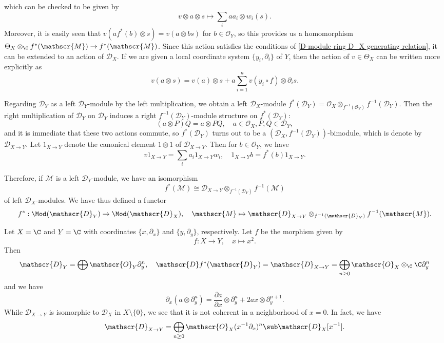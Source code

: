 which can be checked to be given by 
\[v\otimes a\otimes s\mapsto \sum_iaa_i\otimes w_i(s).\]
Moreover, it is easily seen that $v(af^*(b)\otimes s)=v(a\otimes bs)$ for $b\in\mathscr{O}_Y$, so this provides us a homomorphism $\Theta_X\otimes_{\C}f^*(\mathscr{M})\to f^*(\mathscr{M})$. Since this action satisfies the conditions of \cref{D-module ring D_X generating relation}, it can be extended to an action of $\mathscr{D}_X$. If we are given a local coordinate system $\{y_i,\partial_i\}$ of $Y$, then the action of $v\in\Theta_X$ can be written more explicitly as
\begin{equation}\label{D-module inverse image def-4}
v(a\otimes s)=v(a)\otimes s+a\sum_{i=1}^{n}v(y_i\circ f)\otimes\partial_is.
\end{equation}

Regarding $\mathscr{D}_Y$ as a left $\mathscr{D}_Y$-module by the left multiplication, we obtain a left $\mathscr{D}_X$-module $f^*(\mathscr{D}_Y)=\mathscr{O}_X\otimes_{f^{-1}(\mathscr{O}_Y)}f^{-1}(\mathscr{D}_Y)$. Then the right multiplication of $\mathscr{D}_Y$ on $\mathscr{D}_Y$ induces a right $f^{-1}(\mathscr{D}_Y)$-module structure on $f^*(\mathscr{D}_Y)$:
\[(a\otimes P)Q=a\otimes PQ,\quad a\in\mathscr{O}_X,P,Q\in\mathscr{D}_Y,\]
and it is immediate that these two actions commute, so $f^*(\mathscr{D}_Y)$ turns out to be a $(\mathscr{D}_X,f^{-1}(\mathscr{D}_Y))$-bimodule, which is denote by $\mathscr{D}_{X\to Y}$. Let $1_{X\to Y}$ denote the canonical element $1\otimes 1$ of $\mathscr{D}_{X\to Y}$. Then for $b\in\mathscr{O}_Y$, we have
\begin{equation}\label{D-module inverse image def-5}
v1_{X\to Y}=\sum_ia_i1_{X\to Y}w_i,\quad 1_{X\to Y}b=f^*(b)1_{X\to Y}.
\end{equation}

Therefore, if $\mathscr{M}$ is a left $\mathscr{D}_Y$-module, we have an isomorphism
\[f^*(\mathscr{M})\cong \mathscr{D}_{X\to Y}\otimes_{f^{-1}(\mathscr{D}_Y)}f^{-1}(\mathscr{M})\]
of left $\mathscr{D}_X$-modules. We have thus defined a functor
\[f^*:\Mod(\mathscr{D}_Y)\to\Mod(\mathscr{D}_X),\quad \mathscr{M}\mapsto \mathscr{D}_{X\to Y}\otimes_{f^{-1}(\mathscr{D}_Y)}f^{-1}(\mathscr{M}).\]

\begin{example}
Let $X=\C$ and $Y=\C$ with coordinates $\{x,\partial_x\}$ and $\{y,\partial_y\}$, respectively. Let $f$ be the morphism given by
\[f:X\to Y,\quad x\mapsto x^2.\]
Then
\[\mathscr{D}_Y=\bigoplus\mathscr{O}_Y\partial^n_y,\quad \mathscr{D}f^*(\mathscr{D}_Y)=\mathscr{D}_{X\to Y}=\bigoplus_{n\geq 0}\mathscr{O}_X\otimes_{\C}\C\partial_y^n\]
and we have
\[\partial_x(a\otimes\partial_y^n)=\frac{\partial a}{\partial x}\otimes\partial_y^n+2ax\otimes\partial_y^{n+1}.\]
While $\mathscr{D}_{X\to Y}$ is isomorphic to $\mathscr{D}_X$ in $X\setminus\{0\}$, we see that it is not coherent in a neighborhood of $x=0$. In fact, we have
\[\mathscr{D}_{X\to Y}=\bigoplus_{n\geq 0}\mathscr{O}_X(x^{-1}\partial_x)^n\sub\mathscr{D}_X[x^{-1}].\]
\end{example}


